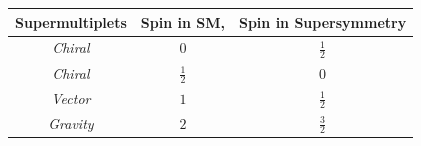 {\begin{center}
\centering
\begin{tabular}{c |c|c}
\toprule
\bfseries{Supermultiplets} & \bfseries {Spin in SM}, & \bfseries{Spin in Supersymmetry}\\
\hline
\textit{Chiral} & $0$ & $\frac{1}{2}$ \\ 
\textit{Chiral} &$\frac{1}{2}$ & $0$ \\   \hline
\textit{Vector} & $1$ & $\frac{1}{2} $ \\ \hline
\textit{Gravity} & $2$ & $\frac{3}{2} $ \\
\hline 
\bottomrule
\end{tabular}
\label{tab:SUSYM} 
\end{center}

}

